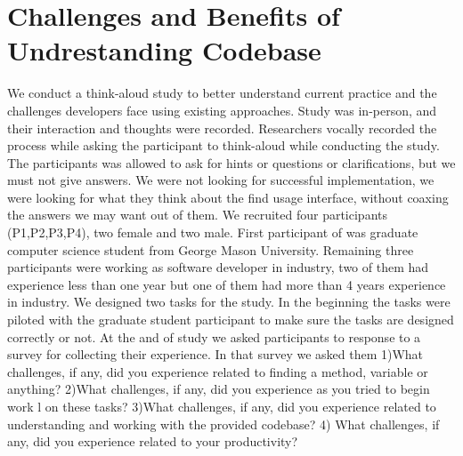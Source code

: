 \documentclass[conference]{IEEEtran}
\begin{document}



\section{Challenges and Benefits of Undrestanding Codebase}
We conduct a think-aloud study to better understand current practice and the challenges developers face using existing approaches. Study was in-person, and their interaction and thoughts were recorded. Researchers vocally recorded the process while asking the participant to think-aloud while conducting the study. The participants was allowed to ask for hints or questions or clarifications, but we must not give answers.
We were not looking for successful implementation, we were looking for what they think about the find usage interface, without coaxing the answers we may want out of them.
We recruited four participants (P1,P2,P3,P4), two female and two male. First participant of was graduate computer science student from George Mason University. Remaining three participants were working as software developer in industry, two of them had experience less than one year but one of them had more than 4 years experience in industry. We designed two tasks for the study. In the beginning the tasks were piloted with the graduate student participant to make sure the tasks are designed correctly or not. At the and of study we asked participants to response to a survey for collecting their experience. In that survey we asked them 1)What challenges, if any, did you experience related to finding a method, variable or anything? 2)What challenges, if any, did you experience as you tried to begin work l on these tasks? 3)What challenges, if any, did you experience related to understanding and working with the provided codebase?   4) What challenges, if any, did you experience related to your productivity? 
\end{document}
